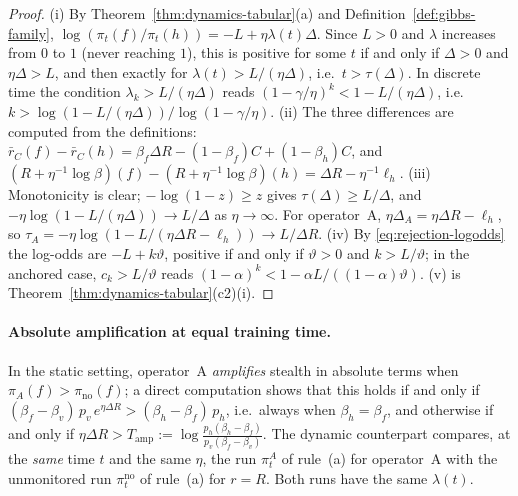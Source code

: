 \begin{proof}
(i) By Theorem~\ref{thm:dynamics-tabular}(a) and
Definition~\ref{def:gibbs-family},
$\log(\pi_t(f)/\pi_t(h))=-L+\eta\lambda(t)\Delta$. Since $L>0$ and
$\lambda$ increases from $0$ to $1$ (never reaching $1$), this is positive
for some $t$ if and only if $\Delta>0$ and $\eta\Delta>L$, and then exactly
for $\lambda(t)>L/(\eta\Delta)$, i.e.\ $t>\tau(\Delta)$. In discrete time
the condition $\lambda_k>L/(\eta\Delta)$ reads
$(1-\gamma/\eta)^k<1-L/(\eta\Delta)$, i.e.\
$k>\log(1-L/(\eta\Delta))/\log(1-\gamma/\eta)$. (ii) The three differences
are computed from the definitions:
$\bar r_C(f)-\bar r_C(h)=\beta_f\Delta R-(1-\beta_f)C+(1-\beta_h)C$, and
$(R+\eta^{-1}\log\beta)(f)-(R+\eta^{-1}\log\beta)(h)=\Delta R-\eta^{-1}\ell_h$.
(iii) Monotonicity is clear; $-\log(1-z)\ge z$ gives
$\tau(\Delta)\ge L/\Delta$, and $-\eta\log(1-L/(\eta\Delta))\to L/\Delta$ as
$\eta\to\infty$. For operator~A, $\eta\Delta_A=\eta\Delta R-\ell_h$, so
$\tau_A=-\eta\log(1-L/(\eta\Delta R-\ell_h))\to L/\Delta R$.
(iv) By \eqref{eq:rejection-logodds} the log-odds are $-L+k\vartheta$,
positive if and only if $\vartheta>0$ and $k>L/\vartheta$; in the anchored
case, $c_k>L/\vartheta$ reads
$(1-\alpha)^k<1-\alpha L/((1-\alpha)\vartheta)$. (v) is
Theorem~\ref{thm:dynamics-tabular}(c2)(i).
\end{proof}

\paragraph{Absolute amplification at equal training time.}
In the static setting, operator~A \emph{amplifies} stealth in absolute
terms when $\pi_A(f)>\pi_{\mathrm{no}}(f)$; a direct computation shows that
this holds if and only if
$(\beta_f-\beta_v)\,p_v\,e^{\eta\Delta R}>(\beta_h-\beta_f)\,p_h$, i.e.\
always when $\beta_h=\beta_f$, and otherwise if and only if
$\eta\Delta R>T_{\mathrm{amp}}:=\log\frac{p_h(\beta_h-\beta_f)}{p_v(\beta_f-\beta_v)}$.
The dynamic counterpart compares, at the \emph{same} time $t$ and the same
$\eta$, the run $\pi^{A}_t$ of rule~(a) for operator~A with the unmonitored
run $\pi^{\mathrm{no}}_t$ of rule~(a) for $r=R$. Both runs have the same
$\lambda(t)$.

